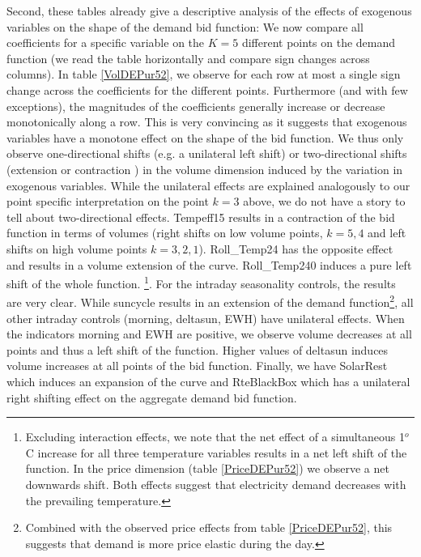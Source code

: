 Second, these tables already give a descriptive analysis of the effects of exogenous variables on the shape of the demand bid function:
We now compare all coefficients for a specific variable on the $K=5$ different points on the demand function (we read the table horizontally and compare sign changes across columns).
In table \ref{VolDEPur52}, we observe for each row at most a single sign change across the coefficients for the different points. Furthermore (and with few exceptions), the magnitudes of the coefficients generally increase or decrease monotonically along a row. 
This is very convincing as it suggests that exogenous variables have a monotone effect on the shape of the bid function. We thus only observe one-directional shifts (e.g. a unilateral left shift) or two-directional shifts (extension or contraction%
) in the volume dimension induced by the variation in exogenous variables. While the unilateral effects are explained analogously to our point specific interpretation on the point $k=3$ above, we do not have a story to tell about two-directional effects.
Tempeff15 results in a contraction of the bid function in terms of volumes (right shifts on low volume points, $k=5,4$ and left shifts on high volume points $k=3,2,1$). Roll\_Temp24 has the opposite effect and results in a volume extension of the curve. Roll\_Temp240 induces a pure left shift of the whole function. \footnote{Excluding interaction effects, we note that the net effect of a simultaneous 1$^o$C increase for all three temperature variables results in a net left shift of the function. In the price dimension (table \ref{PriceDEPur52}) we observe a net downwards shift. Both effects suggest that electricity demand decreases with the prevailing temperature.}. 
For the intraday seasonality controls, the results are very clear. While suncycle results in an extension of the demand function\footnote{Combined with the observed price effects from table \ref{PriceDEPur52}, this suggests that demand is more price elastic during the day.}, all other intraday controls (morning, deltasun, EWH) have unilateral effects. When the indicators morning and EWH are positive, we observe volume decreases at all points and thus a left shift of the function. Higher values of deltasun induces volume increases at all points of the bid function.
Finally, we have SolarRest which induces an expansion of the curve and RteBlackBox which has a unilateral right shifting effect on the aggregate demand bid function. 

